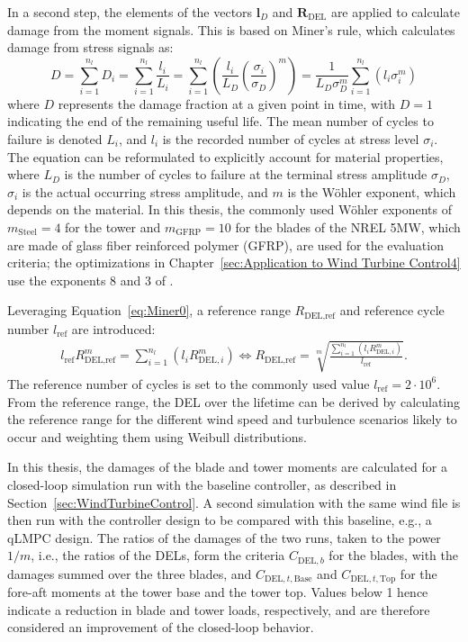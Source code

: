 In a second step, the elements of the vectors $\bm{l}_D$ and $\bm{R}_{\text{DEL}}$ are applied to calculate damage from the moment signals. This is based on Miner’s rule, which calculates damage from stress signals as:
\begin{equation} \label{eq:Miner0}
    D =  \sum_{i=1}^{n_l} D_i = \sum_{i=1}^{n_l} \frac{l_i}{L_i} = 
    \sum_{i=1}^{n_l} \left( \frac{l_i}{L_D} \left(\frac{\sigma_i}{\sigma_D} \right)^m \right)
    = \frac{1}{L_D\sigma_D^m} \sum_{i=1}^{n_l}  \left( l_i \sigma_i^m \right)
\end{equation}
where $D$ represents the damage fraction at a given point in time, with $D = 1$ indicating the end of the remaining useful life. The mean number of cycles to failure is denoted $L_i$, and $l_i$ is the recorded number of cycles at stress level $\sigma_i$. The equation can be reformulated to explicitly account for material properties, where $L_D$ is the number of cycles to failure at the terminal stress amplitude $\sigma_D$, $\sigma_i$ is the actual occurring stress amplitude, and $m$ is the W\"ohler exponent, which depends on the material. In this thesis, the commonly used W\"ohler exponents of $m_{\text{Steel}} = 4$ for the tower and $m_{\text{GFRP}} = 10$ for the blades of the NREL 5MW, which are made of glass fiber reinforced polymer (GFRP), are used for the evaluation criteria; the optimizations in Chapter~\ref{sec:Application to Wind Turbine Control4} use the exponents 8 and 3 of \cite{dittmer2024combined}.

Leveraging Equation~\eqref{eq:Miner0}, a reference range $R_{\text{DEL},\text{ref}}$ and reference cycle number $l_{\text{ref}}$ are introduced:
\begin{align}
    l_{\text{ref}} R_{\text{DEL},\text{ref}} ^m = \sum_{i=1}^{n_l}  \left(l_i R_{\text{DEL},i}^m \right) \iff R_{\text{DEL},\text{ref}} = \sqrt[m]{\frac{ \sum_{i=1}^{n_l} \left(l_i R_{\text{DEL},i}^m \right)}{l_{\text{ref}}}}.
\end{align}
The reference number of cycles is set to the commonly used value $l_{\text{ref}}=2\cdot10^6$. From the reference range, the DEL over the lifetime can be derived by calculating the reference range for the different wind speed and turbulence scenarios likely to occur and weighting them using Weibull distributions.

In this thesis, the damages of the blade and tower moments are calculated for a closed-loop simulation run with the baseline controller, as described in Section~\ref{sec:WindTurbineControl}. A second simulation with the same wind file is then run with the controller design to be compared with this baseline, e.g., a qLMPC design. The ratios of the damages of the two runs, taken to the power $1/m$, i.e., the ratios of the DELs, form the criteria $C_{\text{DEL},b}$ for the blades, with the damages summed over the three blades, and $C_{\text{DEL},t,\text{Base}}$ and $C_{\text{DEL},t,\text{Top}}$ for the fore-aft moments at the tower base and the tower top. Values below 1 hence indicate a reduction in blade and tower loads, respectively, and are therefore considered an improvement of the closed-loop behavior.


